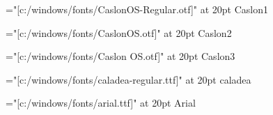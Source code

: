 \documentclass{article}
\begin{document}
\font\1="[c:/windows/fonts/CaslonOS-Regular.otf]" at 20pt\1 Caslon1

\font\1="[c:/windows/fonts/CaslonOS.otf]" at 20pt\1 Caslon2

\font\1="[c:/windows/fonts/Caslon OS.otf]" at 20pt\1 Caslon3

\font\1="[c:/windows/fonts/caladea-regular.ttf]" at 20pt\1 caladea

\font\1="[c:/windows/fonts/arial.ttf]" at 20pt\1 Arial
\end{document}
